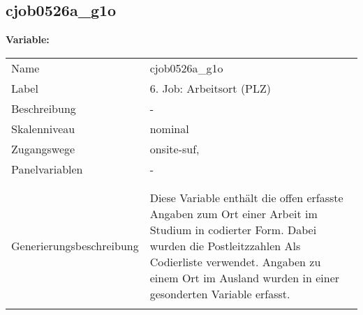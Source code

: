 	
	
	\subsection{cjob0526a\_g1o}
	\label{subSection:cjob0526a_g1o}

	\noindent\textbf{Variable:}\\
		\begin{tabular}{lL{11.3cm}}
			\label{tableVariable:cjob0526a_g1o}
			Name & cjob0526a\_g1o \\
			Label & 6. Job: Arbeitsort (PLZ) \\
			Beschreibung & - \\
			Skalenniveau & nominal \\
			Zugangswege &
				onsite-suf,
 \\
			Panelvariablen & -
			 \\
			 \\
 \\
					Generierungsbeschreibung & Diese Variable enthält die offen erfasste Angaben zum Ort einer Arbeit im Studium in codierter Form. Dabei wurden die Postleitzzahlen Als Codierliste verwendet. Angaben zu einem Ort im Ausland wurden in einer gesonderten Variable erfasst. 
				 \\	
			 \\
		\end{tabular}







